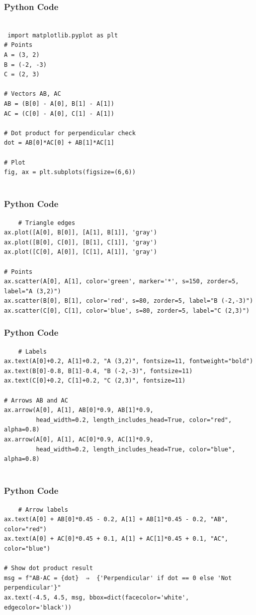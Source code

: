 \documentclass{beamer}
\begin{document}
\begin{frame}[fragile]
    \frametitle{Python Code}
    \begin{lstlisting}
    
 import matplotlib.pyplot as plt
# Points
A = (3, 2)
B = (-2, -3)
C = (2, 3)

# Vectors AB, AC
AB = (B[0] - A[0], B[1] - A[1])
AC = (C[0] - A[0], C[1] - A[1])

# Dot product for perpendicular check
dot = AB[0]*AC[0] + AB[1]*AC[1]

# Plot
fig, ax = plt.subplots(figsize=(6,6))


\end{lstlisting}
\end{frame}

\begin{frame}[fragile]
    \frametitle{Python Code}
    \begin{lstlisting}
    # Triangle edges
ax.plot([A[0], B[0]], [A[1], B[1]], 'gray')
ax.plot([B[0], C[0]], [B[1], C[1]], 'gray')
ax.plot([C[0], A[0]], [C[1], A[1]], 'gray')

# Points
ax.scatter(A[0], A[1], color='green', marker='*', s=150, zorder=5, label="A (3,2)")
ax.scatter(B[0], B[1], color='red', s=80, zorder=5, label="B (-2,-3)")
ax.scatter(C[0], C[1], color='blue', s=80, zorder=5, label="C (2,3)")

   \end{lstlisting}
\end{frame}

\begin{frame}[fragile]
    \frametitle{Python Code}
    \begin{lstlisting}
    # Labels
ax.text(A[0]+0.2, A[1]+0.2, "A (3,2)", fontsize=11, fontweight="bold")
ax.text(B[0]-0.8, B[1]-0.4, "B (-2,-3)", fontsize=11)
ax.text(C[0]+0.2, C[1]+0.2, "C (2,3)", fontsize=11)

# Arrows AB and AC
ax.arrow(A[0], A[1], AB[0]*0.9, AB[1]*0.9, 
         head_width=0.2, length_includes_head=True, color="red", alpha=0.8)
ax.arrow(A[0], A[1], AC[0]*0.9, AC[1]*0.9, 
         head_width=0.2, length_includes_head=True, color="blue", alpha=0.8)


\end{lstlisting}
\end{frame}
\begin{frame}[fragile]
    \frametitle{Python Code}
    \begin{lstlisting}
    # Arrow labels
ax.text(A[0] + AB[0]*0.45 - 0.2, A[1] + AB[1]*0.45 - 0.2, "AB", color="red")
ax.text(A[0] + AC[0]*0.45 + 0.1, A[1] + AC[1]*0.45 + 0.1, "AC", color="blue")

# Show dot product result
msg = f"AB·AC = {dot}  ⇒  {'Perpendicular' if dot == 0 else 'Not perpendicular'}"
ax.text(-4.5, 4.5, msg, bbox=dict(facecolor='white', edgecolor='black'))

    \end{lstlisting}
\end{frame}
   
\end{document}
